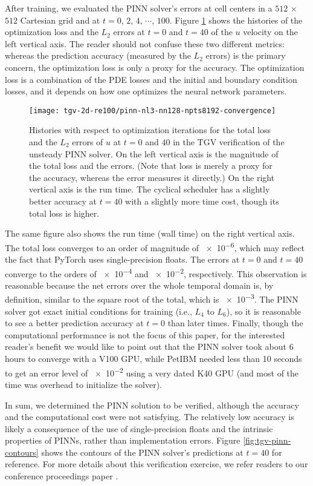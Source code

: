 After training, we evaluated the PINN solver's errors at cell centers in a $512$ $\times$ $512$ Cartesian grid and at $t=0$, $2$, $4$, $\cdots$, $100$.
Figure \ref{fig:tgv-pinn-loss} shows the histories of the optimization loss and the $L_2$ errors at $t=0$ and $t=40$ of the $u$ velocity on the left vertical axis.
The reader should not confuse these two different metrics: whereas the prediction accuracy (measured by the $L_2$ errors) is the primary concern, the optimization loss is only a proxy for the accuracy.
The optimization loss is a combination of the PDE losses and the initial and boundary condition losses, and it depends on how one optimizes the neural network parameters.
\begin{figure}
    \centering%
    \texttt{[image: tgv-2d-re100/pinn-nl3-nn128-npts8192-convergence]}%
    \caption{%
        Histories with respect to optimization iterations for the total loss and the $L_2$ errors of $u$ at $t=0$ and $40$ in the TGV verification of the unsteady PINN solver.
        On the left vertical axis is the magnitude of the total loss and the errors.
        (Note that loss is merely a proxy for the accuracy, whereas the error measures it directly.)
        On the right vertical axis is the run time.
        The cyclical scheduler has a slightly better accuracy at $t=40$ with a slightly more time cost, though its total loss is higher.
    }
    \label{fig:tgv-pinn-loss}%
\end{figure}
The same figure also shows the run time (wall time) on the right vertical axis.
The total loss converges to an order of magnitude of \num{e-6}, which may reflect the fact that PyTorch uses single-precision floats.
The errors at $t=0$ and $t=40$ converge to the orders of \num{e-4} and \num{e-2}, respectively.
This observation is reasonable because the net errors over the whole temporal domain is, by definition, similar to the square root of the total, which is \num{e-3}.
The PINN solver got exact initial conditions for training (i.e., $L_4$ to $L_6$), so it is reasonable to see a better prediction accuracy at $t=0$ than later times.
Finally, though the computational performance is not the focus of this paper, for the interested reader's benefit we would like to point out that the PINN solver took about 6 hours to converge with a V100 GPU, while PetIBM needed less than 10 seconds to get an error level of \num{e-2} using a very dated K40 GPU (and most of the time was overhead to initialize the solver).

In sum, we determined the PINN solution to be verified, although the accuracy and the computational cost were not satisfying.
The relatively low accuracy is likely a consequence of the use of single-precision floats and the intrinsic properties of PINNs, rather than implementation errors.
Figure \ref{fig:tgv-pinn-contours} shows the contours of the PINN solver's predictions at $t=40$ for reference.
For more details about this verification exercise, we refer readers to our conference proceedings paper \cite{chuang_experience_2022}.

